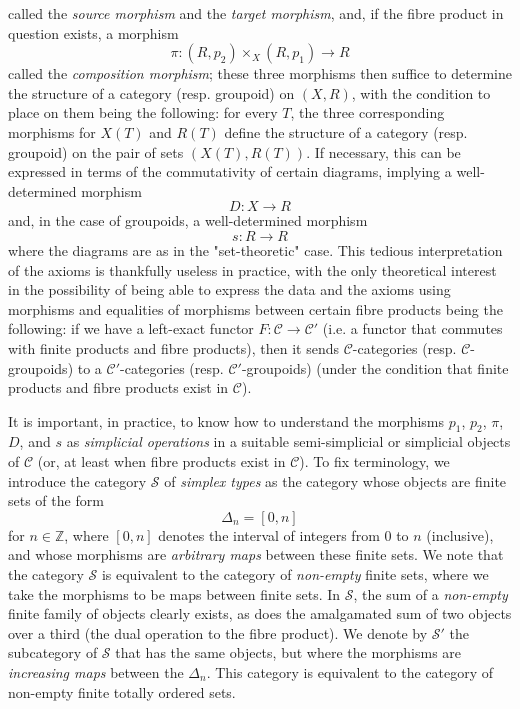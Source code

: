   called the \emph{source morphism} and the \emph{target morphism}, and, if the fibre product in question exists, a morphism
  \[     \pi \colon  (R,p_2)\times _X(R,p_1) \to  R   \]
  called the \emph{composition morphism};
  these three morphisms then suffice to determine the structure of a category (resp. groupoid) on \((X,R)\), with the condition to place on them being the following: for every \(T\), the three corresponding morphisms for \(X(T)\) and \(R(T)\) define the structure of a category (resp. groupoid) on the pair of sets \((X(T),R(T))\).
  If necessary, this can be expressed in terms of the commutativity of certain diagrams, implying a well-determined morphism
  \[     D\colon  X\to  R   \]
  and, in the case of groupoids, a well-determined morphism
  \[     s\colon  R\to  R   \]
  where the diagrams are as in the "set-theoretic" case.
  This tedious interpretation of the axioms is thankfully useless in practice, with the only theoretical interest in the possibility of being able to express the data and the axioms using morphisms and equalities of morphisms between certain fibre products being the following: if we have a left-exact functor \(F\colon \mathcal {C}\to \mathcal {C}'\) (i.e. a functor that commutes with finite products and fibre products), then it sends \(\mathcal {C}\)-categories (resp. \(\mathcal {C}\)-groupoids) to a \(\mathcal {C}'\)-categories (resp. \(\mathcal {C}'\)-groupoids) (under the condition that finite products and fibre products exist in \(\mathcal {C}\)).\par{}It is important, in practice, to know how to understand the morphisms \(p_1\), \(p_2\), \(\pi \), \(D\), and \(s\) as \emph{simplicial operations} in a suitable semi-simplicial or simplicial objects of \(\mathcal {C}\) (or, at least when fibre products exist in \(\mathcal {C}\)).
  To fix terminology, we introduce the category \(\mathcal {S}\) of \emph{simplex types} as the category whose objects are finite sets of the form
  \[     \Delta _n     = [0,n]   \]
  for \(n\in \mathbb {Z}\), where \([0,n]\) denotes the interval of integers from \(0\) to \(n\) (inclusive), and whose morphisms are \emph{arbitrary maps} between these finite sets.
  We note that the category \(\mathcal {S}\) is equivalent to the category of \emph{non-empty} finite sets, where we take the morphisms to be maps between finite sets.
  In \(\mathcal {S}\), the sum of a \emph{non-empty} finite family of objects clearly exists, as does the amalgamated sum of two objects over a third (the dual operation to the fibre product).
  We denote by \(\mathcal {S}'\) the subcategory of \(\mathcal {S}\) that has the same objects, but where the morphisms are \emph{increasing maps} between the \(\Delta _n\).
  This category is equivalent to the category of non-empty finite totally ordered sets.
  
